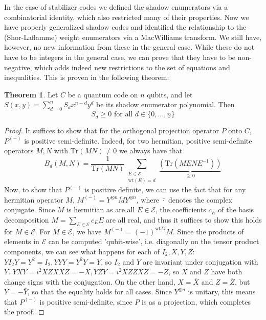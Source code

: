 \documentclass{article}
\def\E{\mathcal{E}}
\def\n{\underline{n}}
\def\fa{\text{ for all }}
\def\Tr{\text{Tr}}
\def\wt{\text{wt}}
\theoremstyle{definition}
\newtheorem{theorem}[Satz]{Theorem}
\begin{document}
In the case of stabilizer codes we defined the shadow enumerators via a combinatorial identity, which also restricted many of their properties.
Now we have properly generalized shadow codes and identified the relationship to the (Shor-Laflamme) weight enumerators via a MacWilliams transform. We still have, however, no new information from these in the general case. 
While these do not have to be integers in the general case, we can prove that they have to be non-negative, which adds indeed new restrictions to the set of equations and inequalities. This is proven in the following theorem:

\begin{theorem}\label{shadowgeq0}
Let $C$ be a quantum code on $n$ qubits, and let $S(x,y)= \sum_{d=0}^n S_d x^{n-d} y^d $ be its shadow enumerator polynomial. Then \begin{equation} S_d \geq 0 \fa d \in \{0, \ldots, \n \} \end{equation}
\begin{proof}
It suffices to show that for the orthogonal projection operator $P$ onto $C$, $P^{(-)}$ is positive semi-definite. Indeed, for two hermitian, positive semi-definite operators $M,N$ with $\Tr(MN) \neq 0$ we always have that
\begin{equation} B_d(M,N) = \frac{1}{\Tr(M N)} \sum_{\substack{E \in \mathcal{E} \\ \wt(E) = d}} \underbrace{(\Tr(M E N E^{-1}))}_{\geq 0} \end{equation}
Now, to show that $P^{(-)}$ is positive definite, we can use the fact that for any hermitian operator $M$,  $M^{(-)} = Y^{\otimes n} \bar M Y^{\otimes n}$, where $\bar \cdot$ denotes the complex conjugate.
Since $M$ is hermitian as are all $E \in \E$, the coefficients $c_E$ of the basis decomposition $M = \sum_{E \in \E} c_E E$ are all real, and thus it suffices to show this holds for $M \in \E$.
For $M \in \E$, we have $ M^{(-)} = (-1)^{\wt M} M$. Since the products of elements in $\E$ can be computed 'qubit-wise', i.e. diagonally on the tensor product components, we can see what happens for each of $I_2, X, Y, Z$:
$YI_2Y = Y^2 = I_2, YYY = Y^2 Y = Y$, so $I_2$ and $Y$ are invariant under conjugation with $Y$. $YXY = i^2 XZXXZ = -X, YZY = i^2 XZZXZ = -Z$, so $X$ and $Z$ have both change signs with the conjugation. 
On the other hand, $X = \bar X$ and $Z = \bar Z$, but $Y = - \bar Y$, so that the equality holds for all cases. Since $Y^{\otimes n}$ is unitary, this means that $P^{(-)}$ is positive semi-definite, since $P$ is as a projection, which completes the proof.
\end{proof}
\end{theorem}
\end{document}
